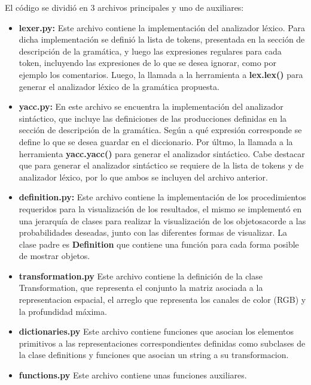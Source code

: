 El c\'odigo se dividi\'o en 3 archivos principales y uno de auxiliares:
\begin{itemize}
\item [] \textbf{lexer.py:} Este archivo contiene la implementaci\'on del analizador l\'exico. Para dicha implementaci\'on se defini\'o la lista de tokens, presentada en la secci\'on de descripci\'on de la gram\'atica, y luego las expresiones regulares para cada token, incluyendo las expresiones de lo que se desea ignorar, como por ejemplo los comentarios. Luego, la llamada a la herramienta a \textbf{lex.lex()} para generar el analizador l\'exico de la gram\'atica propuesta.

\item [] \textbf{yacc.py:} En este archivo se encuentra la implementaci\'on del analizador sint\'actico, que incluye las definiciones de las producciones definidas en la secci\'on de descripci\'on de la gram\'atica. Seg\'un a qu\'e expresi\'on corresponde se define lo que se desea guardar en el diccionario. Por \'ultmo, la llamada a la herramienta \textbf{yacc.yacc()} para generar el analizador sint\'actico. Cabe destacar que para generar el analizador sint\'actico se requiere de la lista de tokens y de analizador l\'exico, por lo que ambos se incluyen del archivo anterior.

\item [] \textbf{definition.py:} Este archivo contiene la implementaci\'on de los procedimientos requeridos para la visualizaci\'on de los resultados, el mismo se implement\'o en una jerarqu\'ia de clases para realizar la visualizaci\'on de los objetosacorde a las probabilidades deseadas, junto con las diferentes formas de visualizar. La clase padre es \textbf{Definition} que contiene una funci\'on para cada forma posible de mostrar objetos. 

\item [] \textbf{transformation.py} Este archivo contiene la definici\'on de la clase Transformation, que representa el conjunto la matriz asociada a la representacion espacial, el arreglo que representa los canales de color (RGB) y la profundidad m\'axima.

\item [] \textbf{dictionaries.py} Este archivo contiene funciones que asocian los elementos primitivos a las representaciones correspondientes definidas como subclases de la clase definitions y funciones que asocian un string a su transformacion.

\item [] \textbf{functions.py} Este archivo contiene unas funciones auxiliares.
\end{itemize}

